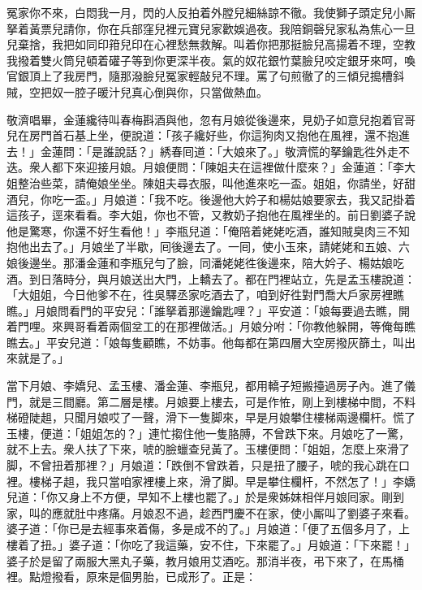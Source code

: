 \begin{myquote} 
冤家你不來，白悶我一月，閃的人反拍着外膛兒細絲諒不徹。我使獅子頭定兒小厮拏着黃票兒請你，你在兵部窪兒裡元寶兒家歡娛過夜。我陪銅磬兒家私為焦心一旦兒棄捨，我把如同印箝兒印在心裡愁無救解。叫着你把那挺臉兒高揚着不理，空教我撥着雙火筒兒頓着礶子等到你更深半夜。氣的奴花銀竹葉臉兒咬定銀牙來呵，喚官銀頂上了我房門，隨那潑臉兒冤家輕敲兒不理。罵了句煎徹了的三傾兒搗槽斜賊，空把奴一腔子暖汁兒真心倒與你，只當做熱血。
\end{myquote} 

敬濟唱畢，金蓮纔待叫春梅斟酒與他，忽有月娘從後邊來，見奶子如意兒抱着官哥兒在房門首石基上坐，便說道：「孩子纔好些，你這狗肉又抱他在風裡，還不抱進去！」金蓮問：「是誰說話？」綉春囘道：「大娘來了。」敬濟慌的拏鑰匙徃外走不迭。衆人都下來迎接月娘。月娘便問：「陳姐夫在這裡做什麼來？」金蓮道：「李大姐整治些菜，請俺娘坐坐。{}陳姐夫尋衣服，叫他進來吃一盃。姐姐，你請坐，好甜酒兒，你吃一盃。」月娘道：「我不吃。後邊他大妗子和楊姑娘要家去，我又記掛着這孩子，逕來看看。李大姐，你也不管，又教奶子抱他在風裡坐的。前日劉婆子說他是驚寒，你還不好生看他！」李瓶兒道：「俺陪着姥姥吃酒，誰知賊臭肉三不知抱他出去了。」月娘坐了半歇，囘後邊去了。一囘，使小玉來，請姥姥和五娘、六娘後邊坐。那潘金蓮和李瓶兒勻了臉，同潘姥姥徃後邊來，陪大妗子、楊姑娘吃酒。到日落時分，與月娘送出大門，上轎去了。都在門裡站立，先是孟玉樓說道：「大姐姐，今日他爹不在，徃吳驛丞家吃酒去了，咱到好徃對門喬大戶家房裡瞧瞧。」月娘問看門的平安兒：「誰拏着那邊鑰匙哩？」平安道：「娘每要過去瞧，開着門哩。來興哥看着兩個坌工的在那裡做活。」月娘分咐：「你教他躲開，等俺每瞧瞧去。」平安兒道：「娘每隻顧瞧，不妨事。他每都在第四層大空房撥灰篩土，叫出來就是了。」

當下月娘、李嬌兒、孟玉樓、潘金蓮、李瓶兒，都用轎子短搬擡過房子內。進了儀門，就是三間廳。第二層是樓。月娘要上樓去，可是作恠，剛上到樓梯中間，不料梯磴陡趄，只聞月娘哎了一聲，滑下一隻脚來，早是月娘攀住樓梯兩邊欄杆。慌了玉樓，便道：「姐姐怎的？」連忙搊住他一隻胳膊，不曾跌下來。月娘吃了一驚，就不上去。衆人扶了下來，唬的臉蠟查兒黃了。玉樓便問：「姐姐，怎麼上來滑了脚，不曾扭着那裡？」月娘道：「跌倒不曾跌着，只是扭了腰子，唬的我心跳在口裡。樓梯子趄，我只當咱家裡樓上來，滑了脚。早是攀住欄杆，不然怎了！」李嬌兒道：「你又身上不方便，早知不上樓也罷了。」於是衆姊妹相伴月娘囘家。剛到家，叫的應就肚中疼痛。月娘忍不過，趁西門慶不在家，使小厮叫了劉婆子來看。婆子道：「你已是去經事來着傷，多是成不的了。」月娘道：「便了五個多月了，上樓着了扭。」婆子道：「你吃了我這藥，安不住，下來罷了。」{}月娘道：「下來罷！」婆子於是留了兩服大黑丸子藥，教月娘用艾酒吃。那消半夜，弔下來了，在馬桶裡。點燈撥看，原來是個男胎，已成形了。正是：

